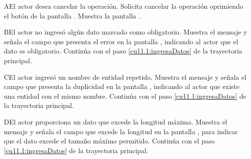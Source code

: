  \begin{UCtrayectoriaA}{A}{El actor desea cancelar la operación.}
    \UCpaso[\UCactor] Solicita cancelar la operación oprimiendo el botón  de la pantalla .
    \UCpaso[\UCsist] Muestra la pantalla .
 \end{UCtrayectoriaA}
 \begin{UCtrayectoriaA}{B}{El actor no ingresó algún dato marcado como obligatorio.}
    \UCpaso[\UCsist] Muestra el mensaje  y señala el campo que presenta el error en la pantalla 
	    , indicando al actor que el dato es obligatorio.
    \UCpaso[] Continúa con el paso \ref{cu11.1:ingresaDatos} de la trayectoria principal.
 \end{UCtrayectoriaA}
 \begin{UCtrayectoriaA}{C}{El actor ingresó un nombre de entidad repetido.}
    \UCpaso[\UCsist] Muestra el mensaje  y señala el campo que presenta la duplicidad en la pantalla 
	    , indicando al actor que existe una entidad con el mismo nombre.
    \UCpaso[] Continúa con el paso \ref{cu11.1:ingresaDatos} de la trayectoria principal.
 \end{UCtrayectoriaA}
 \begin{UCtrayectoriaA}{D}{El actor proporciona un dato que excede la longitud máxima.}
    \UCpaso[\UCsist] Muestra el mensaje  y señala el campo que excede la 
    longitud en la pantalla , para indicar que el dato excede el tamaño máximo permitido.
    \UCpaso[] Continúa con el paso \ref{cu11.1:ingresaDatos} de la trayectoria principal.
 \end{UCtrayectoriaA}
